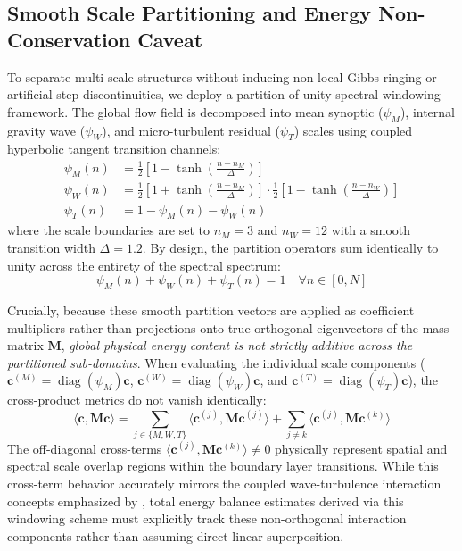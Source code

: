 \documentclass[11pt,a4paper]{article}
\begin{document}
\subsection{Smooth Scale Partitioning and Energy Non-Conservation Caveat}
\label{sec:methods:partition}

To separate multi-scale structures without inducing non-local Gibbs ringing or artificial step discontinuities, we deploy a partition-of-unity spectral windowing framework. The global flow field is decomposed into mean synoptic ($\psi_M$), internal gravity wave ($\psi_W$), and micro-turbulent residual ($\psi_T$) scales using coupled hyperbolic tangent transition channels:
\begin{align}
  \psi_M(n) &= \frac{1}{2}\left[1 - \tanh\left(\frac{n - n_M}{\Delta}\right)\right] \label{eq:psi_m_def} \\
  \psi_W(n) &= \frac{1}{2}\left[1 + \tanh\left(\frac{n - n_M}{\Delta}\right)\right] \cdot \frac{1}{2}\left[1 - \tanh\left(\frac{n - n_W}{\Delta}\right)\right] \label{eq:psi_w_def} \\
  \psi_T(n) &= 1 - \psi_M(n) - \psi_W(n) \label{eq:psi_t_def}
\end{align}
where the scale boundaries are set to $n_M = 3$ and $n_W = 12$ with a smooth transition width $\Delta = 1.2$. By design, the partition operators sum identically to unity across the entirety of the spectral spectrum:
\begin{equation}
\psi_M(n) + \psi_W(n) + \psi_T(n) = 1 \quad \forall n \in [0, N]
\label{eq:partition_unity}
\end{equation}

Crucially, because these smooth partition vectors are applied as coefficient multipliers rather than projections onto true orthogonal eigenvectors of the mass matrix $\mathbf{M}$, \emph{global physical energy content is not strictly additive across the partitioned sub-domains}. When evaluating the individual scale components ($\mathbf{c}^{(M)} = \operatorname{diag}(\psi_M)\mathbf{c}$, $\mathbf{c}^{(W)} = \operatorname{diag}(\psi_W)\mathbf{c}$, and $\mathbf{c}^{(T)} = \operatorname{diag}(\psi_T)\mathbf{c}$), the cross-product metrics do not vanish identically:
\begin{equation}
\langle \mathbf{c}, \mathbf{M} \mathbf{c} \rangle = \sum_{j \in \{M,W,T\}} \langle \mathbf{c}^{(j)}, \mathbf{M} \mathbf{c}^{(j)} \rangle + \sum_{j \neq k} \langle \mathbf{c}^{(j)}, \mathbf{M} \mathbf{c}^{(k)} \rangle
\label{eq:energy_overlap}
\end{equation}
The off-diagonal cross-terms $\langle \mathbf{c}^{(j)}, \mathbf{M} \mathbf{c}^{(k)} \rangle \neq 0$ physically represent spatial and spectral scale overlap regions within the boundary layer transitions. While this cross-term behavior accurately mirrors the coupled wave-turbulence interaction concepts emphasized by \citet{Sun2015}, total energy balance estimates derived via this windowing scheme must explicitly track these non-orthogonal interaction components rather than assuming direct linear superposition.
\end{document}
